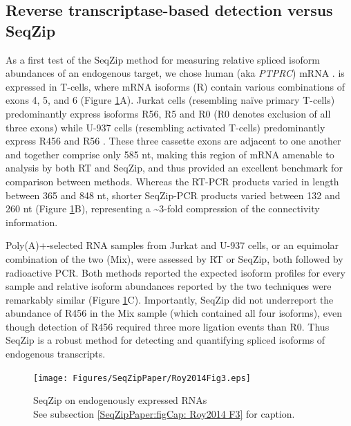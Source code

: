 	\subsection{Reverse transcriptase-based detection versus SeqZip}
		\label{SeqZipPaper:subsec: SeqZip comparable to RT}

		As a first test of the SeqZip method for measuring relative spliced isoform abundances of an endogenous target, we chose human \cd{} (aka \textit{PTPRC}) mRNA \citep{Zikherman2008}. \cd{} is expressed in T-cells, where mRNA isoforms (R) contain various combinations of exons 4, 5, and 6 (Figure \ref{SeqZipPaper:fig:Roy2014 F3}A). Jurkat cells (resembling naïve primary T-cells) predominantly express isoforms R56, R5 and R0 (R0 denotes exclusion of all three exons) while U-937 cells (resembling activated T-cells) predominantly express R456 and R56 \citep{Yeakley2002}. These three cassette exons are adjacent to one another and together comprise only 585 nt, making this region of \cd{} mRNA amenable to analysis by both RT and SeqZip, and thus provided an excellent benchmark for comparison between methods. Whereas the RT-PCR products varied in length between 365 and 848 nt, shorter SeqZip-PCR products varied between 132 and 260 nt (Figure \ref{SeqZipPaper:fig:Roy2014 F3}B), representing a \textasciitilde 3-fold compression of the connectivity information.

		Poly(A)+-selected RNA samples from Jurkat and U-937 cells, or an equimolar combination of the two (Mix), were assessed by RT or SeqZip, both followed by radioactive PCR. Both methods reported the expected isoform profiles for every sample and relative isoform abundances reported by the two techniques were remarkably similar (Figure \ref{SeqZipPaper:fig:Roy2014 F3}C). Importantly, SeqZip did not underreport the abundance of R456 in the Mix sample (which contained all four isoforms), even though detection of R456 required three more ligation events than R0. Thus SeqZip is a robust method for detecting and quantifying spliced isoforms of endogenous transcripts. 

		\begin{figure} %
			\centering 
			\texttt{[image: Figures/SeqZipPaper/Roy2014Fig3.eps]}
			\caption[SeqZip on endogenously expressed RNAs]
			{
				SeqZip on endogenously expressed RNAs\\[0.25cm]
				See subsection \ref{SeqZipPaper:figCap: Roy2014 F3} for caption.
				}
			\label{SeqZipPaper:fig:Roy2014 F3}
			\end{figure}

